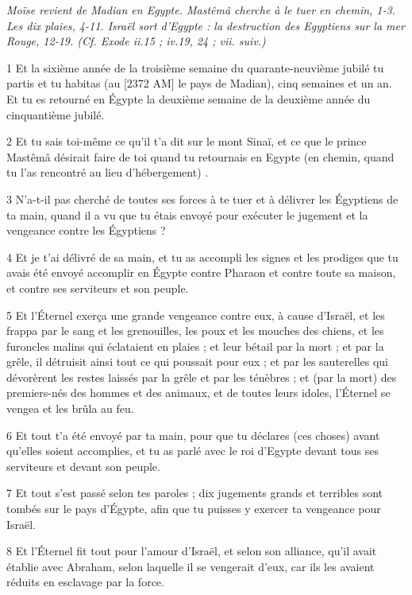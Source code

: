 
\par \textit{Moïse revient de Madian en Egypte. Mastêmâ cherche à le tuer en chemin, 1-3. Les dix plaies, 4-11. Israël sort d'Egypte : la destruction des Egyptiens sur la mer Rouge, 12-19. (Cf. Exode ii.15 ; iv.19, 24 ; vii. suiv.)}

\par 1 Et la sixième année de la troisième semaine du quarante-neuvième jubilé tu partis et tu habitas (au [2372 AM] le pays de Madian), cinq semaines et un an. Et tu es retourné en Égypte la deuxième semaine de la deuxième année du cinquantième jubilé.
\par 2 Et tu sais toi-même ce qu'il t'a dit sur le mont Sinaï, et ce que le prince Mastêmâ désirait faire de toi quand tu retournais en Egypte (en chemin, quand tu l'as rencontré au lieu d'hébergement) .
\par 3 N'a-t-il pas cherché de toutes ses forces à te tuer et à délivrer les Égyptiens de ta main, quand il a vu que tu étais envoyé pour exécuter le jugement et la vengeance contre les Égyptiens ?
\par 4 Et je t'ai délivré de sa main, et tu as accompli les signes et les prodiges que tu avais été envoyé accomplir en Égypte contre Pharaon et contre toute sa maison, et contre ses serviteurs et son peuple.
\par 5 Et l'Éternel exerça une grande vengeance contre eux, à cause d'Israël, et les frappa par le sang et les grenouilles, les poux et les mouches des chiens, et les furoncles malins qui éclataient en plaies ; et leur bétail par la mort ; et par la grêle, il détruisit ainsi tout ce qui poussait pour eux ; et par les sauterelles qui dévorèrent les restes laissés par la grêle et par les ténèbres ; et (par la mort) des premiers-nés des hommes et des animaux, et de toutes leurs idoles, l'Éternel se vengea et les brûla au feu.
\par 6 Et tout t'a été envoyé par ta main, pour que tu déclares (ces choses) avant qu'elles soient accomplies, et tu as parlé avec le roi d'Egypte devant tous ses serviteurs et devant son peuple.
\par 7 Et tout s'est passé selon tes paroles ; dix jugements grands et terribles sont tombés sur le pays d'Égypte, afin que tu puisses y exercer ta vengeance pour Israël.
\par 8 Et l'Éternel fit tout pour l'amour d'Israël, et selon son alliance, qu'il avait établie avec Abraham, selon laquelle il se vengerait d'eux, car ils les avaient réduits en esclavage par la force.
